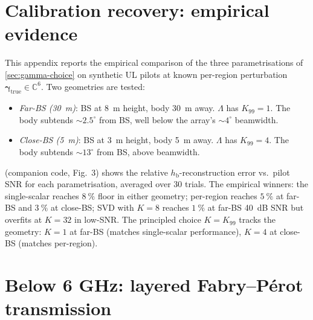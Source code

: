 \documentclass[11pt,a4paper]{article}
\theoremstyle{definition}
\newcommand{\Complex}{\mathbb{C}}
\newcommand{\hbody}{h_{\mathrm{b}}}
\begin{document}
\appendix

\section{Calibration recovery: empirical evidence}\label{sec:eval-cal}

This appendix reports the empirical comparison of the three
parametrisations of \cref{sec:gamma-choice} on synthetic UL
pilots at known per-region perturbation $\bm\gamma_{\mathrm{true}}
\in\Complex^6$.  Two geometries are tested:
\begin{itemize}[leftmargin=1.6em,itemsep=2pt]
\item \emph{Far-BS (\SI{30}{\m})}: BS at \SI{8}{\m} height, body
\SI{30}{\m} away.  $\Lambda$ has $K_{99}=1$.  The body subtends
$\sim 2.5^\circ$ from BS, well below the array's
$\sim 4^\circ$ beamwidth.
\item \emph{Close-BS (\SI{5}{\m})}: BS at \SI{3}{\m} height, body
\SI{5}{\m} away.  $\Lambda$ has $K_{99}=4$.  The body subtends
$\sim 13^\circ$ from BS, above beamwidth.
\end{itemize}
 (companion code, Fig.~3) shows the relative
$\hbody$-reconstruction error vs.\ pilot SNR for each
parametrisation, averaged over 30 trials.  The empirical winners:
the single-scalar reaches $\SI{8}{\percent}$ floor in either
geometry; per-region reaches $\SI{5}{\percent}$ at far-BS and
$\SI{3}{\percent}$ at close-BS; SVD with $K=8$ reaches
$\SI{1}{\percent}$ at far-BS \SI{40}{\dB} SNR but overfits at
$K=32$ in low-SNR.  The principled choice $K=K_{99}$ tracks the
geometry: $K=1$ at far-BS (matches single-scalar performance),
$K=4$ at close-BS (matches per-region).

\section{Below 6 GHz: layered Fabry--P\'erot transmission}\label{sec:layered}
\end{document}
